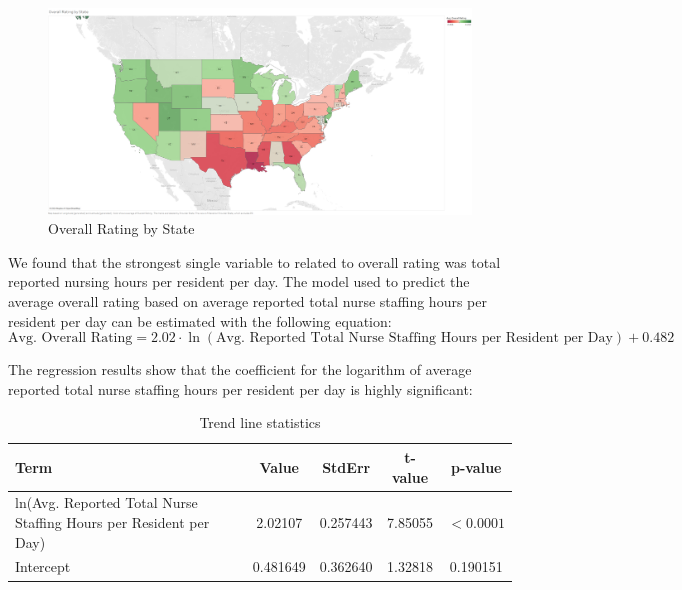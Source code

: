 \documentclass{article}
\theoremstyle{mytheoremstyle}
\theoremstyle{mytheoremstyle}
\theoremstyle{myproblemstyle}
\begin{document}
\begin{figure}[htbp]
\centering
\includegraphics[width=\linewidth]{Images/Overall Rating by State.png}
\caption{Overall Rating by State}
\label{Rating by state}
\end{figure}

\pagebreak

We found that the strongest single variable to related to overall rating was total reported nursing hours per resident per day. The model used to predict the average overall rating based on average reported total nurse staffing hours per resident per day can be estimated with the following equation:
\begin{equation}
    \text{Avg. Overall Rating} = 2.02 \cdot \ln(\text{Avg. Reported Total Nurse Staffing Hours per Resident per Day}) + 0.482
\end{equation}

The regression results show that the coefficient for the logarithm of average reported total nurse staffing hours per resident per day is highly significant:

\begin{table}[ht]
\centering
\caption{Trend line statistics}
\begin{tabular}{@{}lcccc@{}}
\toprule
Term & Value & StdErr & t-value & p-value \\ 
\midrule
ln(Avg. Reported Total Nurse Staffing Hours per Resident per Day) & 2.02107 & 0.257443 & 7.85055 & \(< 0.0001\) \\
Intercept & 0.481649 & 0.362640 & 1.32818 & 0.190151 \\
\bottomrule
\end{tabular}
\end{table}
\end{document}
